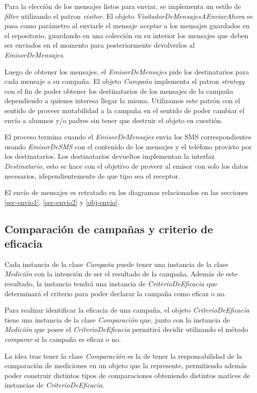 \documentclass[a4paper, 10pt, twoside]{article}
\begin{document}
Para la elección de los mensajes listos para enviar, se implementa un estilo de \textit{filter} utilizando el
patron \textit{visitor}. El objeto \textit{VisitadorDeMensajesAEnviarAhora} se pasa como parámetro al enviarle
el mensaje \textit{aceptar} a los mensajes guardados en el repositorio, guardando en una colección en su interior
los mensajes que deben ser enviados en el momento para posteriormente devolverlos al \textit{EmisorDeMensajes}.

Luego de obtener los mensajes, el \textit{EmisorDeMensajes} pide los destinatarios para cada mensaje a su campaña.
El objeto \textit{Campaña} implementa el patron \textit{strategy} con el fin de poder obtener los destinatarios de 
los mensajes de la campaña dependiendo a quienes interesa llegar la misma. Utilizamos este patrón con el sentido de 
proveer mutabilidad a la campaña en el sentido de poder cambiar el envío a alumnos y/o padres sin tener que destruir 
el objeto en cuestión.

El proceso termina cuando el \textit{EmisorDeMensajes} envia los SMS correspondientes usando \textit{EmisorDeSMS} 
con el contenido de los mensajes y el teléfono provisto por los destinatarios. Los destinatarios devueltos 
implementan la interfaz \textit{Destinatario}, esto se hace con el objetivo de proveer al emisor con solo los 
datos necesarios, idependientemente de que tipo sea el receptor.

El envío de mensajes es retratado en los diagramas relacionados en las secciones \ref{sec-envio1}, \ref{sec-envio2} y 
\ref{obj-envio}.

\subsection{Comparación de campañas y criterio de eficacia}
Cada instancia de la clase \textit{Campaña} puede tener una instancia de la clase \textit{Medición} con la intención 
de ser el resultado de la campaña. Además de este resultado, la instancia tendrá una instancia de 
\textit{CriterioDeEficacia} que determinará el criterio para poder declarar la campaña como eficaz o no.

Para realizar identificar la eficacia de una campaña, el objeto \textit{CriterioDeEficacia} tiene una instancia de la 
clase \textit{Comparación} que, junto con la instancia de \textit{Medición} que posee el \textit{CriterioDeEficacia} 
permitirá decidir utilizando el método \textit{comparar} si la campaña es eficaz o no.

La idea tras tener la clase \textit{Comparación} es la de tener la responsabilidad de la comparación de mediciones 
en un objeto que la represente, permitiendo además poder construir distintos tipos de comparaciones obteniendo distintos 
matices de instancias de \textit{CriterioDeEficacia}.
\end{document}
